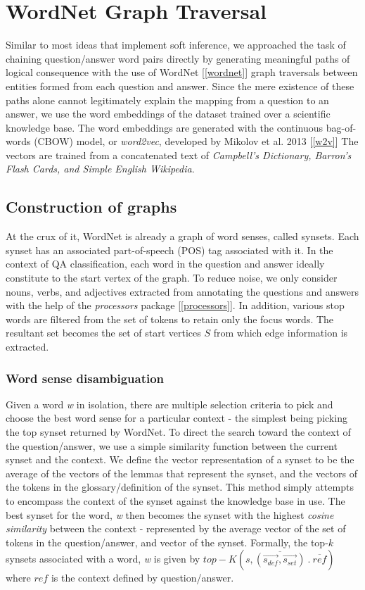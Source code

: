 \section{WordNet Graph Traversal}
Similar to most ideas that implement soft inference, we approached the task of chaining
question/answer word pairs directly by generating meaningful paths of logical consequence
with the use of WordNet [\ref{wordnet}] graph traversals between entities formed from
each question and answer. Since the mere existence of these paths alone cannot legitimately
explain the mapping from a question to an answer, we use the word embeddings of the dataset
trained over a scientific knowledge base. The word embeddings are generated with the 
continuous bag-of-words (CBOW) model, or \emph{word2vec}, developed by Mikolov et al. 2013 [\ref{w2v}]
The vectors are trained from a concatenated text of \emph{Campbell's Dictionary, Barron's Flash Cards,
and Simple English Wikipedia}.

\subsection{Construction of graphs}
At the crux of it, WordNet is already a graph of word senses, called synsets. Each synset has 
an associated part-of-speech (POS) tag associated with it. In the context of QA classification,
each word in the question and answer ideally constitute to the start vertex of the graph.
To reduce noise, we only consider nouns, verbs, and adjectives extracted from annotating the 
questions and answers with the help of the \emph{processors} package [\ref{processors}]. 
In addition, various stop words are filtered from the set of tokens to retain only the focus words. 
The resultant set becomes the set of start vertices $S$ from which edge information is extracted.

\subsubsection{Word sense disambiguation}
Given a word \emph{w} in isolation, there are multiple selection criteria to pick and choose the 
best word sense for a particular context - the simplest being picking the top synset returned by
WordNet. To direct the search toward the context of the question/answer, we use a simple similarity
function between the current synset and the context. We define the vector representation of a 
synset to be the average of the vectors of the lemmas that represent the synset, and the vectors of
the tokens in the glossary/definition of the synset. This method simply attempts to encompass the
context of the synset against the knowledge base in use. The best synset for the word, \emph{w} then
becomes the synset with the highest \emph{cosine similarity} between the context - represented
by the average vector of the set of tokens in the question/answer, and vector of the synset.
Formally, the top-$k$ synsets associated with a word, \emph{w} is given by
$top-K(s, \overline{(\vec{s_{def}}, \vec{s_{set}})}\ \textbf{.}\ \overline{ref})$ where $ref$ is
the context defined by question/answer.

